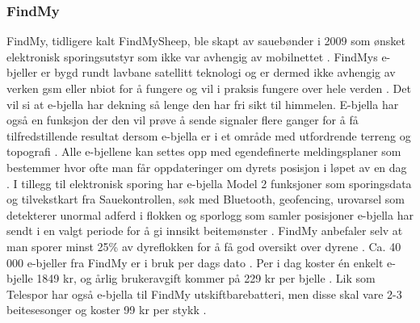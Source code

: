 \subsubsection{FindMy}
FindMy, tidligere kalt FindMySheep, ble skapt av sauebønder i 2009 som ønsket elektronisk sporingsutstyr som ikke var avhengig av mobilnettet \cite{findmyOmOss}. FindMys e-bjeller er bygd rundt lavbane satellitt teknologi og er dermed ikke avhengig av verken \acrshort{gsm} eller \acrshort{nbiot} for å fungere og vil i praksis fungere over hele verden \cite{findmySatelitt}. Det vil si at e-bjella har dekning så lenge den har fri sikt til himmelen. E-bjella har også en funksjon der den vil prøve å sende signaler flere ganger for å få tilfredstillende resultat dersom e-bjella er i et område med utfordrende terreng og topografi \cite{findmyDekningHeleNorge}. Alle e-bjellene kan settes opp med egendefinerte meldingsplaner som bestemmer hvor ofte man får oppdateringer om dyrets posisjon i løpet av en dag \cite{findmySlikFungererSatellittene}. I tillegg til elektronisk sporing har e-bjella Model 2 funksjoner som sporingsdata og tilvekstkart fra Sauekontrollen, søk med Bluetooth, geofencing, urovarsel som detekterer unormal adferd i flokken og sporlogg som samler posisjoner e-bjella har sendt i en valgt periode for å gi innsikt beitemønster \cite{findmyFunksjoner}. FindMy anbefaler selv at man sporer minst 25\% av dyreflokken for å få god oversikt over dyrene \cite{findmyProdukt}. Ca. 40 000 e-bjeller fra FindMy er i bruk per dags dato \cite{findmyFunksjoner}. Per i dag koster én enkelt e-bjelle 1849 kr, og årlig brukeravgift kommer på 229 kr per bjelle \cite{findmyShop}. Lik som Telespor har også e-bjella til FindMy utskiftbarebatteri, men disse skal vare 2-3 beitesesonger og koster 99 kr per stykk \cite{findmyBrukeravgift}. 

